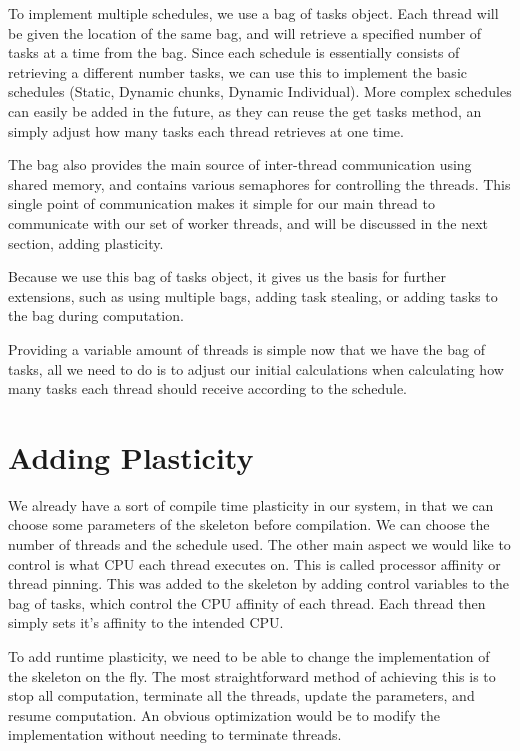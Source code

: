 To implement multiple schedules, we use a bag of tasks object. Each thread will be given the location of the same bag, and will retrieve a specified number of tasks at a time from the bag. Since each schedule is essentially consists of retrieving a different number tasks, we can use this to implement the basic schedules (Static, Dynamic chunks, Dynamic Individual). More complex schedules can easily be added in the future, as they can reuse the get tasks method, an simply adjust how many tasks each thread retrieves at one time.  

The bag also provides the main source of inter-thread communication using shared memory, and contains various semaphores for controlling the threads. This single point of communication makes it simple for our main thread to communicate with our set of worker threads, and will be discussed in the next section, adding plasticity.

Because we use this bag of tasks object, it gives us the basis for further extensions, such as using multiple bags, adding task stealing, or adding tasks to the bag during computation.

Providing a variable amount of threads is simple now that we have the bag of tasks, all we need to do is to adjust our initial calculations when calculating how many tasks each thread should receive according to the schedule.



\section{Adding Plasticity}

We already have a sort of compile time plasticity in our system, in that we can choose some parameters of the skeleton before compilation. We can choose the number of threads and the schedule used. The other main aspect we would like to control is what CPU each thread executes on. This is called processor affinity or thread pinning. This was added to the skeleton by adding control variables to the bag of tasks, which control the CPU affinity of each thread. Each thread then simply sets it's affinity to the intended CPU.

To add runtime plasticity, we need to be able to change the implementation of the skeleton on the fly. The most straightforward method of achieving this is to stop all computation, terminate all the threads, update the parameters, and resume computation. An obvious optimization would be to modify the implementation without needing to terminate threads. 


